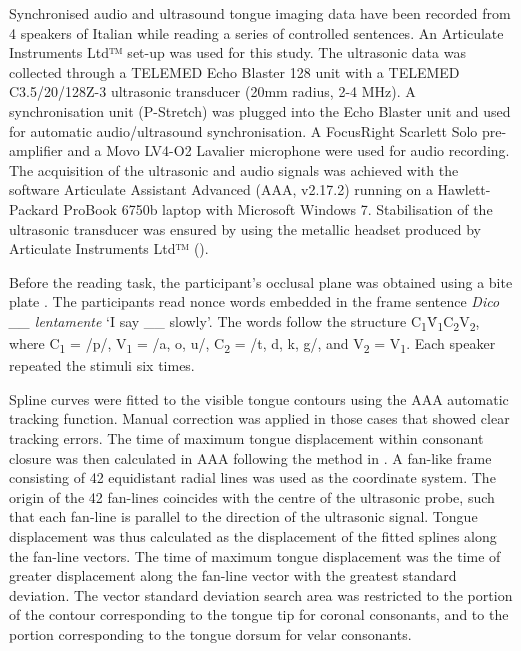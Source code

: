 \documentclass[12pt,]{article}
\begin{document}
Synchronised audio and ultrasound tongue imaging data have been recorded
from 4 speakers of Italian while reading a series of controlled
sentences. An Articulate Instruments Ltd™ set-up was used for this
study. The ultrasonic data was collected through a TELEMED Echo Blaster
128 unit with a TELEMED C3.5/20/128Z-3 ultrasonic transducer (20mm
radius, 2-4 MHz). A synchronisation unit (P-Stretch) was plugged into
the Echo Blaster unit and used for automatic audio/ultrasound
synchronisation. A FocusRight Scarlett Solo pre-amplifier and a Movo
LV4-O2 Lavalier microphone were used for audio recording. The
acquisition of the ultrasonic and audio signals was achieved with the
software Articulate Assistant Advanced (AAA, v2.17.2) running on a
Hawlett-Packard ProBook 6750b laptop with Microsoft Windows 7.
Stabilisation of the ultrasonic transducer was ensured by using the
metallic headset produced by Articulate Instruments Ltd™
(\citeyear{articulate2008}).

Before the reading task, the participant's occlusal plane was obtained
using a bite plate \citep{scobbie2011}. The participants read nonce
words embedded in the frame sentence \emph{Dico \_\_ lentamente} `I say
\_\_ slowly'. The words follow the structure
C\textsubscript{1}V́\textsubscript{1}C\textsubscript{2}V\textsubscript{2},
where C\textsubscript{1} = /p/, V\textsubscript{1} = /a, o, u/,
C\textsubscript{2} = /t, d, k, g/, and V\textsubscript{2} =
V\textsubscript{1}. Each speaker repeated the stimuli six times.

Spline curves were fitted to the visible tongue contours using the AAA
automatic tracking function. Manual correction was applied in those
cases that showed clear tracking errors. The time of maximum tongue
displacement within consonant closure was then calculated in AAA
following the method in \citet{strycharczuk2015}. A fan-like frame
consisting of 42 equidistant radial lines was used as the coordinate
system. The origin of the 42 fan-lines coincides with the centre of the
ultrasonic probe, such that each fan-line is parallel to the direction
of the ultrasonic signal. Tongue displacement was thus calculated as the
displacement of the fitted splines along the fan-line vectors. The time
of maximum tongue displacement was the time of greater displacement
along the fan-line vector with the greatest standard deviation. The
vector standard deviation search area was restricted to the portion of
the contour corresponding to the tongue tip for coronal consonants, and
to the portion corresponding to the tongue dorsum for velar consonants.
\end{document}
